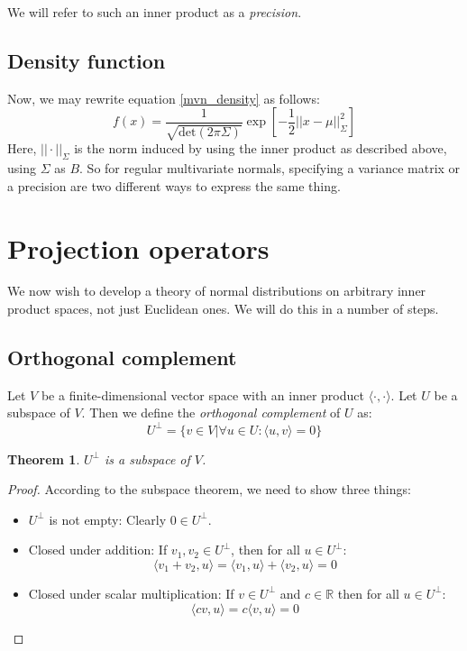 \documentclass[12pt, a4paper]{article}
\newtheorem{theorem}{Theorem}[section]
\numberwithin{equation}{section}
\begin{document}
We will refer to such an inner product as a \textit{precision}.

\subsection{Density function}
Now, we may rewrite equation \ref{mvn_density} as follows:
\begin{equation}
f(x)=\frac{1}{\sqrt{\textrm{det}(2\pi\Sigma)}}\exp\left[-\frac{1}{2}||x-\mu||_\Sigma^2\right]
\end{equation}
Here, $||\cdot||_\Sigma$ is the norm induced by using the inner product as described above, using $\Sigma$ as $B$. So for regular multivariate normals, specifying a variance matrix or a precision are two different ways to express the same thing.

\section{Projection operators}
We now wish to develop a theory of normal distributions on arbitrary inner product spaces, not just Euclidean ones. We will do this in a number of steps.

\subsection{Orthogonal complement}
Let $V$ be a finite-dimensional vector space with an inner product $\langle\cdot,\cdot\rangle$. Let $U$ be a subspace of $V$. Then we define the \textit{orthogonal complement} of $U$ as:
\begin{equation}
U^\perp=\{v\in V|\forall u\in U: \langle u, v\rangle = 0\}
\end{equation}
\begin{theorem}
$U^\perp$ is a subspace of $V$.
\end{theorem}
\begin{proof}
According to the subspace theorem, we need to show three things:
\begin{itemize}
\item $U^\perp$ is not empty: Clearly $0\in U^\perp$.
\item Closed under addition: If $v_1,v_2\in U^\perp$, then for all $u\in U^\perp$:
\begin{equation}
\langle v_1+v_2,u\rangle=\langle v_1,u\rangle + \langle v_2,u\rangle = 0 
\end{equation}
\item Closed under scalar multiplication: If $v\in U^\perp$ and $c\in\mathbb{R}$ then for all $u\in U^\perp$:
\begin{equation}
\langle cv,u\rangle = c\langle v,u\rangle = 0
\end{equation}
\end{itemize}
\end{proof}
\end{document}
